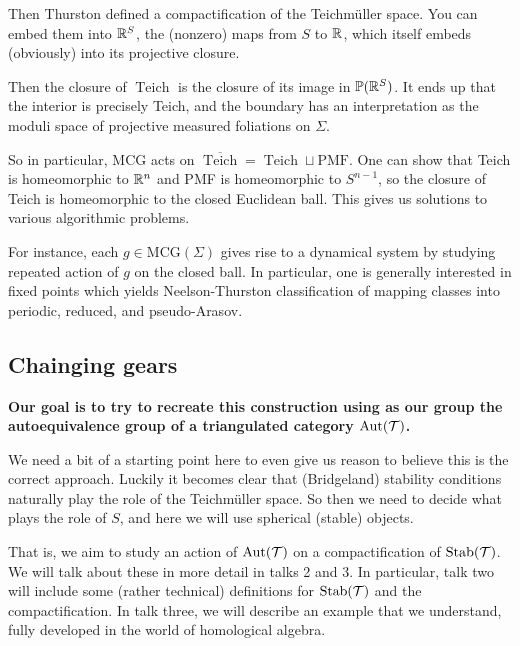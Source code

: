 \documentclass[12pt]{article}
\begin{document}
Then Thurston defined a compactification of the Teichm\"uller space. You can embed them into $\mathbb{R}^S$, the (nonzero) maps from $S$ to $\mathbb{R}$, which itself embeds (obviously)
into its projective closure.

Then the closure of $\operatorname{Teich}$ is the closure of its image in $\mathbb{P}(\mathbb{R}^S)$. It ends up that the interior is precisely Teich, and the 
boundary has an interpretation as the moduli space of projective measured foliations on $\Sigma.$

So in particular, MCG acts on $\overline{\operatorname{Teich}}=\operatorname{Teich}\sqcup \text{PMF}$. One can show that Teich is homeomorphic to $\mathbb{R}^n$ and PMF is homeomorphic to $S^{n-1}$, 
so the closure of Teich is homeomorphic to the closed Euclidean ball. This gives us solutions to various algorithmic problems.

For instance, each $g\in$MCG$(\Sigma)$ gives rise to a dynamical system by studying repeated action of $g$ on the closed ball. In particular, one is generally interested in fixed points which yields 
Neelson-Thurston classification of mapping classes into periodic, reduced, and pseudo-Arasov.

\subsection{Chainging gears}
\textbf{Our goal is to try to recreate this construction using as our group the autoequivalence group of a triangulated category $\operatorname{Aut}(\mathcal{T})$.}

We need a bit of a starting point here to even give us reason to believe this is the correct approach. Luckily it becomes clear that (Bridgeland) stability conditions naturally play the role of the Teichm\"uller space.
So then we need to decide what plays the role of $S$, and here we will use spherical (stable) objects.

That is, we aim to study an action of $\operatorname{Aut}(\mathcal{T})$ on a compactification of $\operatorname{Stab}(\mathcal{T})$. We will talk about these in more detail in talks 2 and 3.
In particular, talk two will include some (rather technical) definitions for $\operatorname{Stab}(\mathcal{T})$ and the compactification. In talk three, we will 
describe an example that we understand, fully developed in the world of homological algebra.
\end{document}
